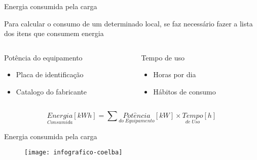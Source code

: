 \begin{frame}{Energia consumida pela carga}

Para calcular o consumo de um determinado local, se faz necessário fazer a lista dos itens que consumem energia 

\vspace{.5cm}

\begin{columns}[T]
    \begin{column}{0.5\textwidth}
		\begin{alertblock}{Potência do equipamento}
			\begin{itemize}
			\item Placa de identificação
			\item Catalogo do fabricante
			\end{itemize}
		\end{alertblock}
    \end{column}
    \begin{column}{0.5\textwidth}  
    	\begin{alertblock}{Tempo de uso}
			\begin{itemize}
			\item Horas por dia
			\item Hábitos de consumo	
			\end{itemize}
		\end{alertblock}  		
    \end{column}
\end{columns}

\vspace{.5cm}

\begin{center}
\begin{equation*}
\underset{Consumida}{Energia}\left [ kWh \right ]=\sum \underset{do \; Equipamento}{Pot\hat{e}ncia}\left [ kW \right ] \times \underset{de \; Uso}{Tempo}\left [ h \right ]
\end{equation*}
\end{center} 

\end{frame}

\begin{frame}{Energia consumida pela carga}

\begin{figure}[H]
	\texttt{[image: infografico-coelba]}
\end{figure}

\end{frame}


